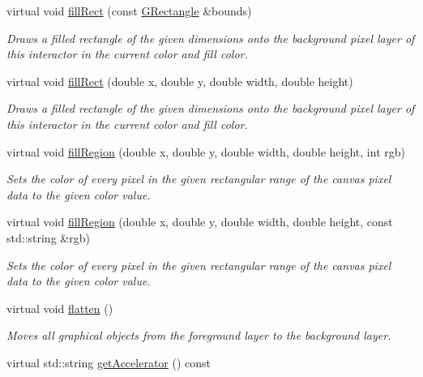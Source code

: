 \begin{DoxyCompactItemize}
virtual void \mbox{\hyperlink{classsgl_1_1GDrawingSurface_ae6582295003bf2488836b1993dadbad7}{fill\+Rect}} (const \mbox{\hyperlink{structsgl_1_1GRectangle}{G\+Rectangle}} \&bounds)
\begin{DoxyCompactList}\small\item\em Draws a filled rectangle of the given dimensions onto the background pixel layer of this interactor in the current color and fill color. \end{DoxyCompactList}\item 
virtual void \mbox{\hyperlink{classsgl_1_1GDrawingSurface_aac3ae7d3aee950de78eca0e108352254}{fill\+Rect}} (double x, double y, double width, double height)
\begin{DoxyCompactList}\small\item\em Draws a filled rectangle of the given dimensions onto the background pixel layer of this interactor in the current color and fill color. \end{DoxyCompactList}\item 
virtual void \mbox{\hyperlink{classsgl_1_1GCanvas_af4146bdcb26135b739b9b4f13db03435}{fill\+Region}} (double x, double y, double width, double height, int rgb)
\begin{DoxyCompactList}\small\item\em Sets the color of every pixel in the given rectangular range of the canvas pixel data to the given color value. \end{DoxyCompactList}\item 
virtual void \mbox{\hyperlink{classsgl_1_1GCanvas_a762c611a5065687112018e7a0ab10c84}{fill\+Region}} (double x, double y, double width, double height, const std\+::string \&rgb)
\begin{DoxyCompactList}\small\item\em Sets the color of every pixel in the given rectangular range of the canvas pixel data to the given color value. \end{DoxyCompactList}\item 
virtual void \mbox{\hyperlink{classsgl_1_1GCanvas_a4c4590df33ce47ad8a42e06f9f44fc93}{flatten}} ()
\begin{DoxyCompactList}\small\item\em Moves all graphical objects from the foreground layer to the background layer. \end{DoxyCompactList}\item 
virtual std\+::string \mbox{\hyperlink{classsgl_1_1GInteractor_a69f8d23ed8f207fbecad99960776e942}{get\+Accelerator}} () const

\end{DoxyCompactItemize}
